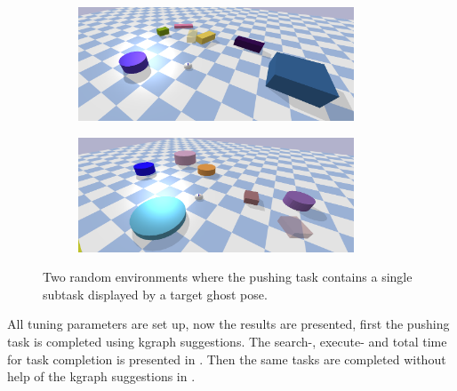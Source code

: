 \begin{figure}[H]
    \centering
    \begin{subfigure}{\textwidth}
    \centering
    \includegraphics[width=0.9\textwidth]{figures/results/random_1}
    \caption{}
    \end{subfigure}

    \vspace{0.2cm}
    \begin{subfigure}{\textwidth}
    \centering
    \includegraphics[width=0.9\textwidth]{figures/results/random_2}
    \caption{}
    \end{subfigure}
    \caption{Two random environments where the pushing task contains a single subtask displayed by a target ghost pose.}%
    \label{fig:random_environnment}
\end{figure}

All tuning parameters are set up, now the results are presented, first the pushing task is completed using \ac{kgraph} suggestions. The search-, execute- and total time for task completion is presented in . Then the same tasks are completed without help of the \ac{kgraph} suggestions in . 

